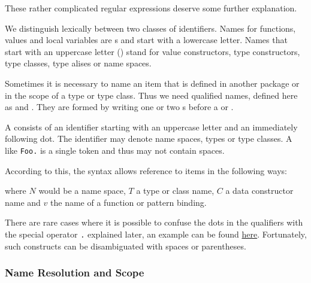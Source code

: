 These rather complicated regular expressions deserve some further
explanation.

We distinguish lexically between two classes of identifiers.
Names for functions, values and local variables are s
and start with a lowercase letter.
Names that start with an uppercase letter ()
stand for value constructors,
type constructors, type classes, type alises or name spaces.

Sometimes it is necessary to name an item that is defined in another
package or in the scope of a type or type class. Thus we need qualified
names, defined here as  and . They are formed
by writing one or two s before a  or .

A  consists of an identifier starting
with an uppercase letter and an immediately
following dot. The identifier may denote name spaces, types or type
classes. A  like \texttt{Foo.} is a single
token and thus may not contain spaces.

According to this, the syntax allows reference to items in the following ways:


where $N$ would be a name space, $T$ a type or class name, $C$ a
data constructor name and $v$ the name of a function or pattern binding.

There are rare cases where it is possible to confuse the dots in the qualifiers with
the special operator \texttt{.} explained later, an example can be found  \hyperref[confusedots]{here}. 
Fortunately, such constructs can be disambiguated with spaces or parentheses.


\subsubsection{Name Resolution and Scope}

